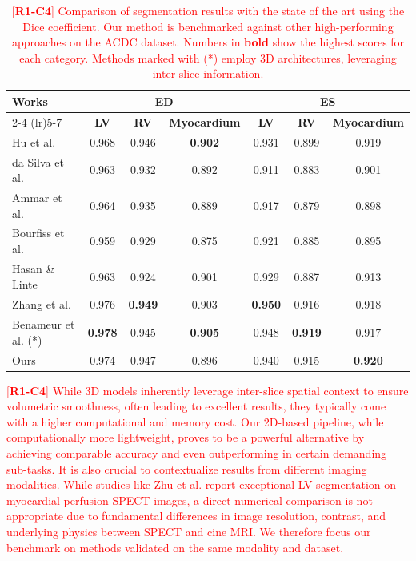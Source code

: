 \documentclass[fleqn,10pt]{wlscirep}
\newcommand{\revtag}[2]{[\textbf{R#1-C#2}]}
\newcommand{\Rone}[1]{\textcolor{red}{#1}}
\begin{document}
\begin{table}[ht]
\centering
\caption{\Rone{\revtag{1}{4} Comparison of segmentation results with the state of the art using the Dice coefficient. Our method is benchmarked against other high-performing approaches on the ACDC dataset. Numbers in \textbf{bold} show the highest scores for each category. Methods marked with (*) employ 3D architectures, leveraging inter-slice information.}}
\label{tab:segmentation_comparison_sota}
\begin{tabular}{lcccccc}
\toprule
\textbf{Works} & \multicolumn{3}{c}{\textbf{ED}} & \multicolumn{3}{c}{\textbf{ES}} \\
\cmidrule(lr){2-4} \cmidrule(lr){5-7}
 & \textbf{LV} & \textbf{RV} & \textbf{Myocardium} & \textbf{LV} & \textbf{RV} & \textbf{Myocardium} \\
\midrule
Hu et al. \cite{Hu:2023} & 0.968 & 0.946 & \textbf{0.902} & 0.931 & 0.899 & 0.919 \\
da Silva et al. \cite{daSilva:2024} & 0.963 & 0.932 & 0.892 & 0.911 & 0.883 & 0.901 \\
Ammar et al. \cite{Ammar:2021} & 0.964 & 0.935 & 0.889 & 0.917 & 0.879 & 0.898 \\
Bourfiss et al. \cite{Bourfiss:2023} & 0.959 & 0.929 & 0.875 & 0.921 & 0.885 & 0.895 \\
Hasan \& Linte \cite{Hasan:2020} & 0.963 & 0.924 & 0.901 & 0.929 & 0.887 & 0.913 \\
Zhang et al. \cite{Zhang:2022} & 0.976 & \textbf{0.949} & 0.903 & \textbf{0.950} & 0.916 & 0.918 \\
Benameur et al. (*)\cite{Benameur:2025} & \textbf{0.978} & 0.945 & \textbf{0.905} & 0.948 & \textbf{0.919} & 0.917 \\
Ours & 0.974 & 0.947 & 0.896 & 0.940 & 0.915 & \textbf{0.920} \\
\bottomrule
\end{tabular}
\end{table}

\Rone{\revtag{1}{4} While 3D models inherently leverage inter-slice spatial context to ensure volumetric smoothness, often leading to excellent results, they typically come with a higher computational and memory cost. Our 2D-based pipeline, while computationally more lightweight, proves to be a powerful alternative by achieving comparable accuracy and even outperforming in certain demanding sub-tasks. It is also crucial to contextualize results from different imaging modalities. While studies like Zhu et al. \cite{Zhu:2023} report exceptional LV segmentation on myocardial perfusion SPECT images, a direct numerical comparison is not appropriate due to fundamental differences in image resolution, contrast, and underlying physics between SPECT and cine MRI. We therefore focus our benchmark on methods validated on the same modality and dataset.}
\end{document}
